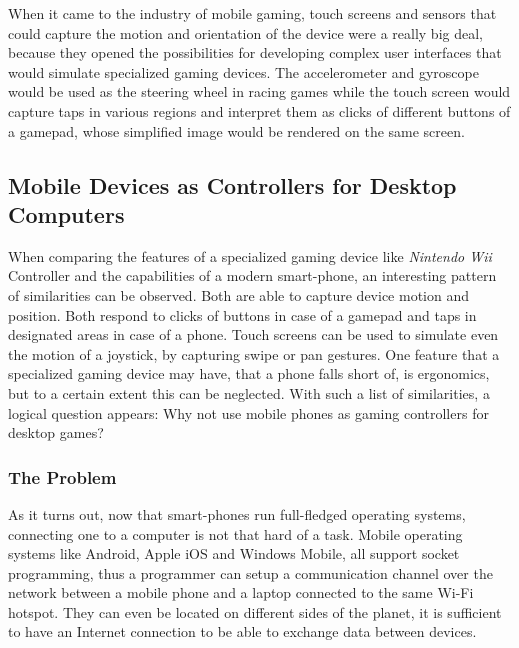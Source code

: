 When it came to the industry of mobile gaming, touch screens and sensors that
could capture the motion and orientation of the device were a really big deal,
because they opened the possibilities for developing complex user interfaces
that would simulate specialized gaming devices. The accelerometer and
gyroscope would be used as the steering wheel in racing games while the touch
screen would capture taps in various regions and interpret them as clicks of
different buttons of a gamepad, whose simplified image would be rendered on
the same screen.


\subsection{Mobile Devices as Controllers for Desktop Computers}

When comparing the features of a specialized gaming device like \emph{Nintendo
Wii} Controller and the capabilities of a modern smart-phone, an interesting
pattern of similarities can be observed. Both are able to capture device
motion and position. Both respond to clicks of buttons in case of a gamepad
and taps in designated areas in case of a phone. Touch screens can be used to
simulate even the motion of a joystick, by capturing swipe or pan gestures.
One feature that a specialized gaming device may have, that a phone falls
short of, is ergonomics, but to a certain extent this can be neglected. With
such a list of similarities, a logical question appears: Why not use mobile
phones as gaming controllers for desktop games?

\subsubsection{The Problem}

As it turns out, now that smart-phones run full-fledged operating systems,
connecting one to a computer is not that hard of a task. Mobile operating
systems like Android, Apple iOS and Windows Mobile, all support socket
programming, thus a programmer can setup a communication channel over the
network between a mobile phone and a laptop connected to the same Wi-Fi
hotspot. They can even be located on different sides of the planet, it is
sufficient to have an Internet connection to be able to exchange data between
devices.

